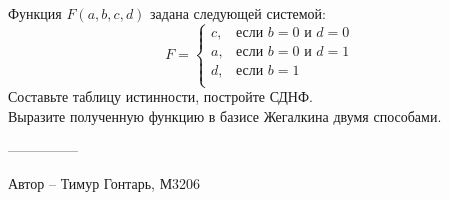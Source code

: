 \question
Функция $F(a, b, c, d)$ задана следующей системой:
\begin{equation*}
    F =
    \begin{cases}
        c, &\text{если $b=0$ и $d=0$}\\
        a, &\text{если $b=0$ и $d=1$}\\
        d, &\text{если $b=1$}\\
    \end{cases}
\end{equation*}
Составьте таблицу истинности, постройте СДНФ.
\\
Выразите полученную функцию в базисе Жегалкина двумя способами.

---------------

Автор -- Тимур Гонтарь, М3206